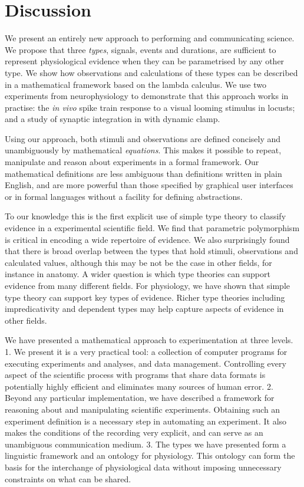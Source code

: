 \section*{Discussion}

We present an entirely new approach to performing and communicating
science. We propose that three \emph{types}, signals, events and
durations, are sufficient to represent physiological evidence when
they can be parametrised by any other type. We show how observations
and calculations of these types can be described in a mathematical
framework based on the lambda calculus. We use two experiments from
neurophysiology to demonstrate that this approach works in practise:
the \emph{in vivo} spike train response to a visual looming stimulus
in locusts; and a study of synaptic integration in with dynamic clamp.

Using our approach, both stimuli and observations are defined
concisely and unambiguously by mathematical \emph{equations}. This
makes it possible to repeat, manipulate and reason about experiments
in a formal framework. Our mathematical definitions are less ambiguous
than definitions written in plain English, and are more powerful than
those specified by graphical user interfaces or in formal languages
without a facility for defining abstractions.

To our knowledge this is the first explicit use of simple type theory
to classify evidence in a experimental scientific field. We find that
parametric polymorphism is critical in encoding a wide repertoire of
evidence. We also surprisingly found that there is broad overlap
between the types that hold stimuli, observations and calculated
values, although this may be not be the case in other fields, for
instance in anatomy. A wider question is which type theories can
support evidence from many different fields. For physiology, we have
shown that simple type theory \citep{Pierce2002} can support key types
of evidence. Richer type theories including impredicativity and
dependent types \citep{Pierce2002} may help capture aspects of
evidence in other fields.

We have presented a mathematical approach to experimentation at three
levels. 1. We present it is a very practical tool: a collection of
computer programs for executing experiments and analyses, and data
management. Controlling every aspect of the scientific process with
programs that share data formats is potentially highly efficient and
eliminates many sources of human error. 2. Beyond any particular
implementation, we have described a framework for reasoning about and
manipulating scientific experiments. Obtaining such an experiment
definition is a necessary step in automating an experiment.  It also
makes the conditions of the recording very explicit, and can serve as
an unambiguous communication medium. 3. The types we have
presented form a linguistic framework and an ontology for
physiology. This ontology can form the basis for the interchange of
physiological data without imposing unnecessary constraints on what
can be shared.

